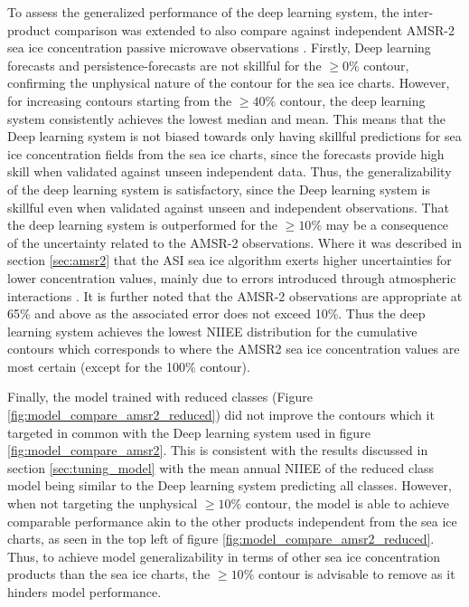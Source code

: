 \documentclass[../main/thesis]{subfiles}
\begin{document}
To assess the generalized performance of the deep learning system, the inter-product comparison was extended to also compare against independent AMSR-2 sea ice concentration passive microwave observations \citep{Spreen2008}. Firstly, Deep learning forecasts and persistence-forecasts are not skillful for the $\geq0\%$ contour, confirming the unphysical nature of the contour for the sea ice charts. However, for increasing contours starting from the $\geq40\%$ contour, the deep learning system consistently achieves the lowest median and mean. This means that the Deep learning system is not biased towards only having skillful predictions for sea ice concentration fields from the sea ice charts,  since the forecasts provide high skill when validated against unseen independent data. Thus, the generalizability of the deep learning system is satisfactory, since the Deep learning system is skillful even when validated against unseen and independent observations. That the deep learning system is outperformed for the $\geq10\%$ may be a consequence of the uncertainty related to the AMSR-2 observations. Where it was described in section \ref{sec:amsr2} that the ASI sea ice algorithm exerts higher uncertainties for lower concentration values, mainly due to errors introduced through atmospheric interactions \citep{Spreen2008}. It is further noted that the AMSR-2 observations are appropriate at 65\% and above as the associated error does not exceed 10\%. Thus the deep learning system achieves the lowest NIIEE distribution for the cumulative contours which corresponds to where the AMSR2 sea ice concentration values are most certain (except for the 100\% contour).

Finally, the model trained with reduced classes (Figure \ref{fig:model_compare_amsr2_reduced}) did not improve the contours which it targeted in common with the Deep learning system used in figure \ref{fig:model_compare_amsr2}. This is consistent with the results discussed in section \ref{sec:tuning_model} with the mean annual NIIEE of the reduced class model being similar to the Deep learning system predicting all classes. However, when not targeting the unphysical $\geq10\%$ contour, the model is able to achieve comparable performance akin to the other products independent from the sea ice charts, as seen in the top left of figure \ref{fig:model_compare_amsr2_reduced}. Thus, to achieve model generalizability in terms of other sea ice concentration products than the sea ice charts, the $\geq10\%$ contour is advisable to remove as it hinders model performance.
\end{document}

